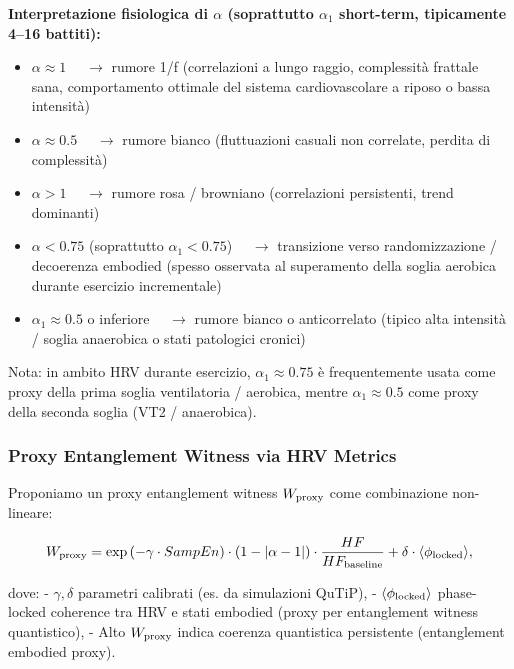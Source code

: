 \documentclass[11pt,a4paper]{article}
\theoremstyle{plain}
\theoremstyle{definition}
\begin{document}
\textbf{Interpretazione fisiologica di $\alpha$ (soprattutto $\alpha_1$ short-term, tipicamente 4–16 battiti):}
\begin{itemize}
    \item $\alpha \approx 1$ $\quad \to$ \quad rumore 1/f (correlazioni a lungo raggio, complessità frattale sana, comportamento ottimale del sistema cardiovascolare a riposo o bassa intensità)
    \item $\alpha \approx 0.5$ $\quad \to$ \quad rumore bianco (fluttuazioni casuali non correlate, perdita di complessità)
    \item $\alpha > 1$ $\quad \to$ \quad rumore rosa / browniano (correlazioni persistenti, trend dominanti)
    \item $\alpha < 0.75$ (soprattutto $\alpha_1 < 0.75$) $\quad \to$ \quad transizione verso randomizzazione / decoerenza embodied (spesso osservata al superamento della soglia aerobica durante esercizio incrementale)
    \item $\alpha_1 \approx 0.5$ o inferiore $\quad \to$ \quad rumore bianco o anticorrelato (tipico alta intensità / soglia anaerobica o stati patologici cronici)
\end{itemize}

Nota: in ambito HRV durante esercizio, $\alpha_1 \approx 0.75$ è frequentemente usata come proxy della prima soglia ventilatoria / aerobica, mentre $\alpha_1 \approx 0.5$ come proxy della seconda soglia (VT2 / anaerobica).


\vspace{0.4cm}



\subsubsection{Proxy Entanglement Witness via HRV Metrics}

Proponiamo un proxy entanglement witness $W_{\rm proxy}$ come combinazione non-lineare:

\begin{equation}
W_{\rm proxy} = \exp\left( - \gamma \cdot SampEn \right) \cdot \left( 1 - |\alpha - 1| \right) \cdot \frac{HF}{HF_{\rm baseline}} + \delta \cdot \langle \phi_{\rm locked} \rangle,
\label{eq:proxy_ent_witness}
\end{equation}

dove:
- $\gamma, \delta$ parametri calibrati (es. da simulazioni QuTiP),
- $\langle \phi_{\rm locked} \rangle$ phase-locked coherence tra HRV e stati embodied (proxy per entanglement witness quantistico),
- Alto $W_{\rm proxy}$ indica coerenza quantistica persistente (entanglement embodied proxy).
\end{document}
